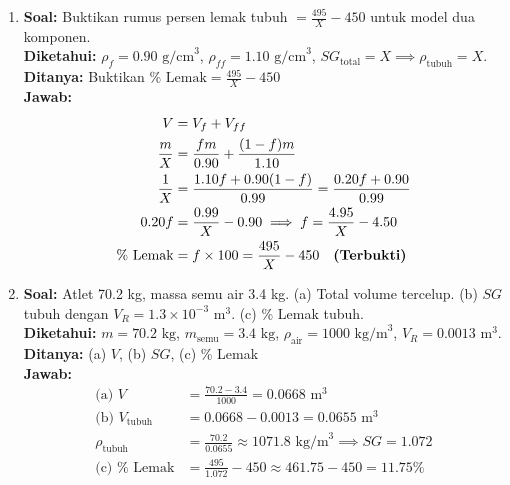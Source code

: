 \documentclass[twocolumn]{article}
\begin{document}
\begin{enumerate}
    \item \textbf{Soal:} Buktikan rumus persen lemak tubuh $= \frac{495}{X} - 450$ untuk model dua komponen. \\
    \textbf{Diketahui:} $\rho_f = 0.90 \text{ g/cm}^3$, $\rho_{ff} = 1.10 \text{ g/cm}^3$, $SG_{\text{total}} = X \implies \rho_{\text{tubuh}} = X$. \\
    \textbf{Ditanya:} Buktikan $\% \text{ Lemak} = \frac{495}{X} - 450$ \\
    \textbf{Jawab:}
    \begin{align*}
        V &= V_f + V_{ff} \\
        \frac{m}{X} &= \frac{fm}{0.90} + \frac{(1-f)m}{1.10} \\
        \frac{1}{X} &= \frac{1.10f + 0.90(1-f)}{0.99} = \frac{0.20f + 0.90}{0.99} \\
        0.20f &= \frac{0.99}{X} - 0.90 \implies f = \frac{4.95}{X} - 4.50 \\
        \% \text{ Lemak} &= f \times 100 = \frac{495}{X} - 450 \quad \text{\textbf{(Terbukti)}}
    \end{align*}

    \item \textbf{Soal:} Atlet 70.2 kg, massa semu air 3.4 kg. (a) Total volume tercelup. (b) $SG$ tubuh dengan $V_R = 1.3 \times 10^{-3} \text{ m}^3$. (c) \% Lemak tubuh. \\
    \textbf{Diketahui:} $m = 70.2 \text{ kg}$, $m_{\text{semu}} = 3.4 \text{ kg}$, $\rho_{\text{air}} = 1000 \text{ kg/m}^3$, $V_R = 0.0013 \text{ m}^3$. \\
    \textbf{Ditanya:} (a) $V$, (b) $SG$, (c) \% Lemak \\
    \textbf{Jawab:}
    \begin{align*}
        \text{(a) } V &= \frac{70.2 - 3.4}{1000} = 0.0668 \text{ m}^3 \\
        \text{(b) } V_{\text{tubuh}} &= 0.0668 - 0.0013 = 0.0655 \text{ m}^3 \\
        \rho_{\text{tubuh}} &= \frac{70.2}{0.0655} \approx 1071.8 \text{ kg/m}^3 \implies SG = 1.072 \\
        \text{(c) } \% \text{ Lemak} &= \frac{495}{1.072} - 450 \approx 461.75 - 450 = 11.75\%
    \end{align*}


\end{enumerate}
\end{document}
